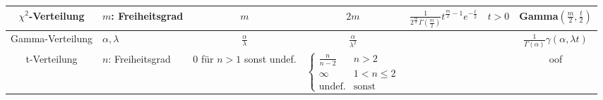 {\begin{tabular}{||c|p{2cm}|*{4}{c|}|}
		$\chi^2$-Verteilung                                                                            & $m$: Freiheitsgrad                                                                 & $m$                        & $2m$                                                                                 & $\frac
			{1}{2^{\frac {m}{2}}\Gamma ({\tfrac {m}{2}})}t^{{\frac {m}{2}}-1}e^
		{-{\frac {t}{2}}}\quad t>0$                                                                    & Gamma$(\frac{m}{2}, \frac{t}{2})$                                                                                                                                                                                            \\[8pt]
		\hline

		Gamma-Verteilung                                                                               & $\alpha,\lambda$                                                                   & $\frac{\alpha}{\lambda}$   & $\frac{\alpha}{\lambda^2}$                                                           &
		\raisebox{-5pt}{${\begin{aligned}{\frac {\lambda ^{\alpha }t^{\alpha -1}e^{-\lambda t}}{\Gamma
							                  (\alpha )}}\quad t>0\quad \alpha ,\lambda >0\end{aligned}}$} & ${\frac
		{1}{\Gamma (\alpha )}}\gamma (\alpha ,\lambda t)$                                                                                                                                                                                                                                                                             \\[10pt]
		\hline

		t-Verteilung                                                                                   & $n$: Freiheitsgrad                                                                 & $0$ für $n>1$ sonst undef. & $\begin{cases} \frac{n}{n-2} &
              n > 2           \\ \infty & 1 < n \leq 2 \\ \text{undef.} & \text{sonst}\end{cases}$ &
		\raisebox{-2pt}{$\frac{\Gamma\left( \frac{n+1}{2}\right)}{\sqrt{n\pi} \cdot \Gamma(\frac{n}{2})}
		\left(1 + \frac{t^2}{n}\right)^{- \frac{n+1}{2}}$}                                             & oof                                                                                                                                                                                                                          \\[10pt]
		\hline


\end{tabular}}
